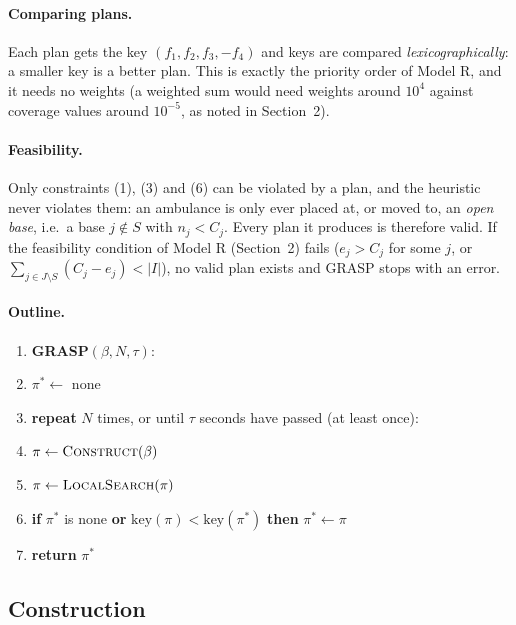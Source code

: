 \paragraph{Comparing plans.} Each plan gets the key $(f_1, f_2, f_3, -f_4)$ and keys are
compared \emph{lexicographically}: a smaller key is a better plan. This is exactly the
priority order of Model R, and it needs no weights (a weighted sum would need weights around
$10^4$ against coverage values around $10^{-5}$, as noted in Section~2).

\paragraph{Feasibility.} Only constraints (1), (3) and (6) can be violated by a plan, and the
heuristic never violates them: an ambulance is only ever placed at, or moved to, an
\emph{open base}, i.e.\ a base $j \notin S$ with $n_j < C_j$. Every plan it produces is therefore
valid. If the feasibility condition of Model R (Section~2) fails ($e_j > C_j$ for some $j$, or
$\sum_{j \in J\setminus S}(C_j - e_j) < |I|$), no valid plan exists and GRASP stops with an error.

\paragraph{Outline.}
\begin{enumerate}[label=, leftmargin=1.5em, itemsep=0pt]
  \item \textbf{GRASP}$(\beta, N, \tau)$:
  \item \quad $\pi^\ast \gets$ none
  \item \quad \textbf{repeat} $N$ times, or until $\tau$ seconds have passed (at least once):
  \item \qquad $\pi \gets \textsc{Construct}(\beta)$
  \item \qquad $\pi \gets \textsc{LocalSearch}(\pi)$
  \item \qquad \textbf{if} $\pi^\ast$ is none \textbf{or} $\mathrm{key}(\pi) < \mathrm{key}(\pi^\ast)$ \textbf{then} $\pi^\ast \gets \pi$
  \item \quad \textbf{return} $\pi^\ast$
\end{enumerate}

\subsection{Construction}

